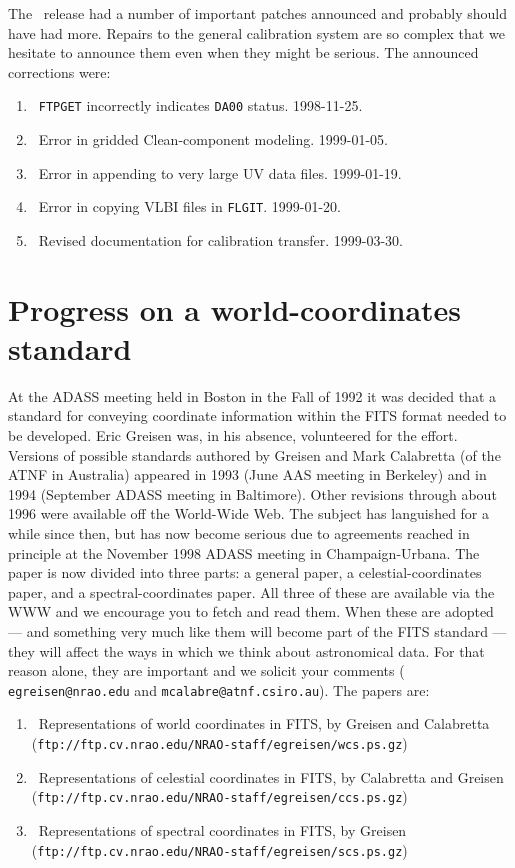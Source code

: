 The \OLDNAME\ release had a number of important patches announced and
probably should have had more.  Repairs to the general calibration
system are so complex that we hesitate to announce them even when they
might be serious.  The announced corrections were:
\begin{enumerate}
\item\ {\tt FTPGET} incorrectly indicates {\tt DA00} status.
   1998-11-25.
\item\ Error in gridded Clean-component modeling. 1999-01-05.
\item\ Error in appending to very large UV data files.  1999-01-19.
\item\ Error in copying VLBI files in {\tt FLGIT}.  1999-01-20.
\item\ Revised documentation for calibration transfer.  1999-03-30.
\end{enumerate}

\section{Progress on a world-coordinates standard}

At the ADASS meeting held in Boston in the Fall of 1992 it was decided
that a standard for conveying coordinate information within the FITS
format needed to be developed.  Eric Greisen was, in his absence,
volunteered for the effort.  Versions of possible standards authored
by Greisen and Mark Calabretta (of the ATNF in Australia) appeared in
1993 (June AAS meeting in Berkeley) and in 1994 (September ADASS
meeting in Baltimore).  Other revisions through about 1996 were
available off the World-Wide Web.  The subject has languished for a
while since then, but has now become serious due to agreements reached
in principle at the November 1998 ADASS meeting in Champaign-Urbana.
The paper is now divided into three parts: a general paper, a
celestial-coordinates paper, and a spectral-coordinates paper.  All
three of these are available via the WWW and we encourage you to fetch
and read them.  When these are adopted --- and something very much
like them will become part of the FITS standard --- they will affect
the ways in which we think about astronomical data.  For that reason
alone, they are important and we solicit your comments ({\tt
egreisen@nrao.edu} and {\tt mcalabre@atnf.csiro.au}).  The papers
are:
\renewcommand{\labelenumi}{\Roman{enumi}.}
\begin{enumerate}
\item\  Representations of world coordinates in FITS, by Greisen and
  Calabretta\\
  ({\tt ftp://ftp.cv.nrao.edu/NRAO-staff/egreisen/wcs.ps.gz})
\item\ Representations of celestial coordinates in FITS, by Calabretta
  and Greisen\\
  ({\tt ftp://ftp.cv.nrao.edu/NRAO-staff/egreisen/ccs.ps.gz})
\item\ Representations of spectral coordinates in FITS, by Greisen\\
  ({\tt ftp://ftp.cv.nrao.edu/NRAO-staff/egreisen/scs.ps.gz})
\end{enumerate}
\renewcommand{\labelenumi}{\arabic{enumi}.}

